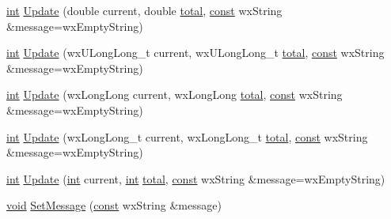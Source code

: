 \begin{DoxyCompactItemize}
\item 
\hyperlink{xmltok_8h_a5a0d4a5641ce434f1d23533f2b2e6653}{int} \hyperlink{class_progress_dialog_ac3197af37df346ffa9e8730f2a5fb7a0}{Update} (double current, double \hyperlink{nyx_8c_a245b65fbced50370bf8a01069e5ee177}{total}, \hyperlink{getopt1_8c_a2c212835823e3c54a8ab6d95c652660e}{const} wx\+String \&message=wx\+Empty\+String)
\item 
\hyperlink{xmltok_8h_a5a0d4a5641ce434f1d23533f2b2e6653}{int} \hyperlink{class_progress_dialog_a127607b3eb7b5e5279ce6c2163f000a4}{Update} (wx\+U\+Long\+Long\+\_\+t current, wx\+U\+Long\+Long\+\_\+t \hyperlink{nyx_8c_a245b65fbced50370bf8a01069e5ee177}{total}, \hyperlink{getopt1_8c_a2c212835823e3c54a8ab6d95c652660e}{const} wx\+String \&message=wx\+Empty\+String)
\item 
\hyperlink{xmltok_8h_a5a0d4a5641ce434f1d23533f2b2e6653}{int} \hyperlink{class_progress_dialog_a0072caacd150f57ca9ef7b0de18033d6}{Update} (wx\+Long\+Long current, wx\+Long\+Long \hyperlink{nyx_8c_a245b65fbced50370bf8a01069e5ee177}{total}, \hyperlink{getopt1_8c_a2c212835823e3c54a8ab6d95c652660e}{const} wx\+String \&message=wx\+Empty\+String)
\item 
\hyperlink{xmltok_8h_a5a0d4a5641ce434f1d23533f2b2e6653}{int} \hyperlink{class_progress_dialog_a96a9270fc86786709d32955d11149570}{Update} (wx\+Long\+Long\+\_\+t current, wx\+Long\+Long\+\_\+t \hyperlink{nyx_8c_a245b65fbced50370bf8a01069e5ee177}{total}, \hyperlink{getopt1_8c_a2c212835823e3c54a8ab6d95c652660e}{const} wx\+String \&message=wx\+Empty\+String)
\item 
\hyperlink{xmltok_8h_a5a0d4a5641ce434f1d23533f2b2e6653}{int} \hyperlink{class_progress_dialog_a2507aaa82284a97c5e0fe5761532cf8b}{Update} (\hyperlink{xmltok_8h_a5a0d4a5641ce434f1d23533f2b2e6653}{int} current, \hyperlink{xmltok_8h_a5a0d4a5641ce434f1d23533f2b2e6653}{int} \hyperlink{nyx_8c_a245b65fbced50370bf8a01069e5ee177}{total}, \hyperlink{getopt1_8c_a2c212835823e3c54a8ab6d95c652660e}{const} wx\+String \&message=wx\+Empty\+String)
\item 
\hyperlink{sound_8c_ae35f5844602719cf66324f4de2a658b3}{void} \hyperlink{class_progress_dialog_a4ec6904c8079c9a477e0a92c7263ee1e}{Set\+Message} (\hyperlink{getopt1_8c_a2c212835823e3c54a8ab6d95c652660e}{const} wx\+String \&message)
\end{DoxyCompactItemize}
